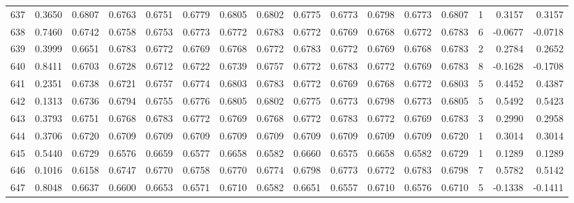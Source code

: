 \begin{tabular}{lrrrrrrrrrrrrrrr}
637 &      0.3650 &  0.6807 &  0.6763 &  0.6751 &  0.6779 &  0.6805 &  0.6802 &  0.6775 &  0.6773 &  0.6798 &   0.6773 &     0.6807 &      1 &                    0.3157 &                     0.3157 \\
638 &      0.7460 &  0.6742 &  0.6758 &  0.6753 &  0.6773 &  0.6772 &  0.6783 &  0.6772 &  0.6769 &  0.6768 &   0.6772 &     0.6783 &      6 &                   -0.0677 &                    -0.0718 \\
639 &      0.3999 &  0.6651 &  0.6783 &  0.6772 &  0.6769 &  0.6768 &  0.6772 &  0.6783 &  0.6772 &  0.6769 &   0.6768 &     0.6783 &      2 &                    0.2784 &                     0.2652 \\
640 &      0.8411 &  0.6703 &  0.6728 &  0.6712 &  0.6722 &  0.6739 &  0.6757 &  0.6772 &  0.6783 &  0.6772 &   0.6769 &     0.6783 &      8 &                   -0.1628 &                    -0.1708 \\
641 &      0.2351 &  0.6738 &  0.6721 &  0.6757 &  0.6774 &  0.6803 &  0.6783 &  0.6772 &  0.6769 &  0.6768 &   0.6772 &     0.6803 &      5 &                    0.4452 &                     0.4387 \\
642 &      0.1313 &  0.6736 &  0.6794 &  0.6755 &  0.6776 &  0.6805 &  0.6802 &  0.6775 &  0.6773 &  0.6798 &   0.6773 &     0.6805 &      5 &                    0.5492 &                     0.5423 \\
643 &      0.3793 &  0.6751 &  0.6768 &  0.6783 &  0.6772 &  0.6769 &  0.6768 &  0.6772 &  0.6783 &  0.6772 &   0.6769 &     0.6783 &      3 &                    0.2990 &                     0.2958 \\
644 &      0.3706 &  0.6720 &  0.6709 &  0.6709 &  0.6709 &  0.6709 &  0.6709 &  0.6709 &  0.6709 &  0.6709 &   0.6709 &     0.6720 &      1 &                    0.3014 &                     0.3014 \\
645 &      0.5440 &  0.6729 &  0.6576 &  0.6659 &  0.6577 &  0.6658 &  0.6582 &  0.6660 &  0.6575 &  0.6658 &   0.6582 &     0.6729 &      1 &                    0.1289 &                     0.1289 \\
646 &      0.1016 &  0.6158 &  0.6747 &  0.6770 &  0.6758 &  0.6770 &  0.6774 &  0.6798 &  0.6773 &  0.6772 &   0.6783 &     0.6798 &      7 &                    0.5782 &                     0.5142 \\
647 &      0.8048 &  0.6637 &  0.6600 &  0.6653 &  0.6571 &  0.6710 &  0.6582 &  0.6651 &  0.6557 &  0.6710 &   0.6576 &     0.6710 &      5 &                   -0.1338 &                    -0.1411 \\

\end{tabular}
